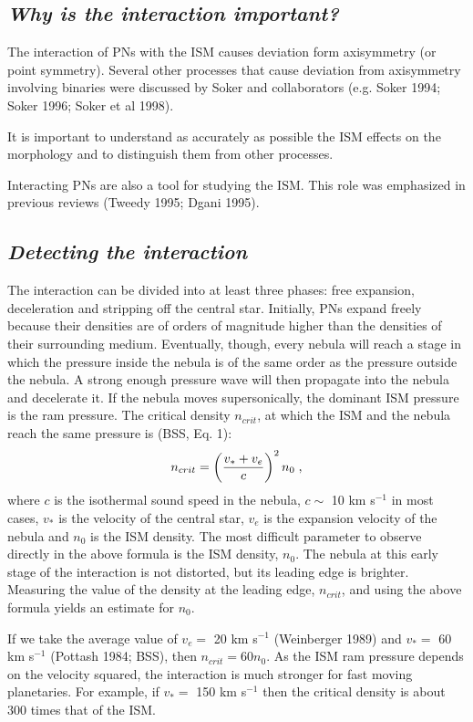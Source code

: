 \documentclass{article}
\begin{document}
\subsection{\it Why is the interaction important?}
The interaction of PNs with the ISM causes deviation form axisymmetry 
(or point symmetry). Several other processes
that cause deviation from axisymmetry involving binaries were discussed by 
Soker and collaborators (e.g. Soker 1994; Soker 1996; Soker et al 1998).

It is important to understand as accurately as possible the ISM effects on
the morphology and to distinguish them from other processes.

Interacting PNs are also a tool for studying the ISM. This role was
emphasized in previous reviews (Tweedy 1995; Dgani 1995).

\subsection{\it Detecting the interaction}
The interaction can be divided into at least three phases: free expansion,
deceleration and stripping off the central star. Initially, PNs expand freely
because their densities are of orders of magnitude higher than the densities of 
their surrounding medium. Eventually, though, every nebula will reach a stage
in which the pressure inside the nebula is of the same order as the pressure
outside the nebula.
 A strong enough pressure wave will then propagate into the nebula and 
decelerate it.
If the nebula moves supersonically, the dominant ISM pressure is the ram
pressure.  The critical density $n_{crit}$, at which the ISM and the nebula 
reach the same pressure is (BSS, Eq. 1):
 \begin{eqnarray}
  n_{crit} =\left({v_*+v_{e}\over c}\right)^2 n_{0} \;, 
\end{eqnarray}
where $c$ is the isothermal sound speed in the nebula,
$c\sim $ 10 km s$^{-1}$
in most cases, $v_*$ is the velocity of the central star,
$v_{e}$ is the expansion velocity of the nebula
and $n_0$ is the ISM density.
The most difficult parameter to observe directly  in the above
formula is the ISM density, $n_0$.
The nebula at this early stage of the interaction is
not distorted, but its leading edge is brighter.  Measuring the
value of the density at the leading edge, $n_{crit}$, and using the  
above formula yields an estimate for $n_0$.

\noindent
If we take the average value of $v_{e}=$ 20 km s$^{-1}$ (Weinberger 1989)
and $v_*= $ 60 km s$^{-1}$ (Pottash 1984; BSS), then $n_{crit}=60 n_0$.
As the ISM ram pressure depends on the velocity squared,
the interaction is much stronger for fast moving planetaries.
For example, if $v_*=$ 150 km s$^{-1}$  then the critical
density is about $300$ times that of the ISM.
\end{document}
